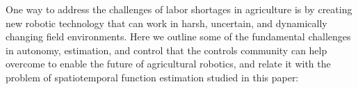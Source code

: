 

One way to address the challenges of labor shortages in agriculture is by creating new robotic technology that can work in harsh, uncertain, and dynamically changing field environments. %
Here we outline some of the fundamental challenges in autonomy, estimation, and control that the controls community can help overcome to enable the future of agricultural robotics, and relate it with the problem of spatiotemporal function estimation studied in this paper:

